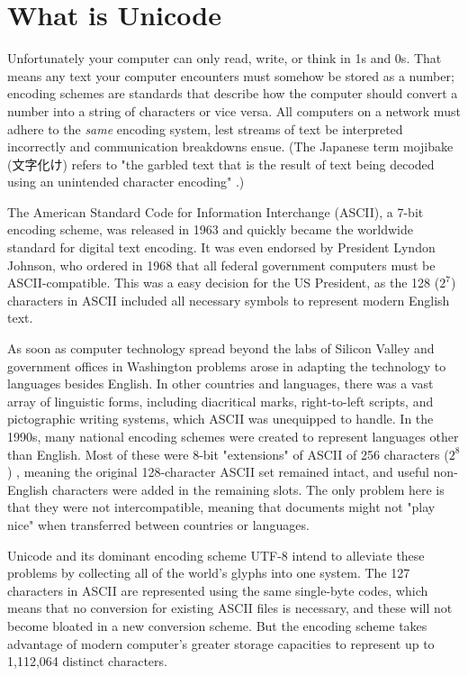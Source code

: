 \section{What is Unicode}

Unfortunately your computer can only read, write, or think in 1s and 0s. That
means any text your computer encounters must somehow be stored as a number;
encoding schemes are standards that describe how the computer should convert a
number into a string of characters or vice versa. All computers on a network
must adhere to the \textit{same} encoding system, lest streams of text be
interpreted incorrectly and communication breakdowns ensue. (The Japanese term
mojibake ({\jpfont 文字化け}) refers to "the garbled text that is the result of
text being decoded using an unintended character encoding"
\parencite{mojibake}.)

The American Standard Code for Information Interchange (ASCII), a 7-bit encoding
scheme, was released in 1963 and quickly became the worldwide standard for
digital text encoding. It was even endorsed by President Lyndon Johnson, who
ordered in 1968 that all federal government computers must be ASCII-compatible.
This was a easy decision for the US President, as the 128 ($2^7$) characters in
ASCII included all necessary symbols to represent modern English text.
\parencite{tero12}

As soon as computer technology spread beyond the labs of Silicon Valley and
government offices in Washington problems arose in adapting the technology to
languages besides English. In other countries and languages, there was a vast
array of linguistic forms, including diacritical marks, right-to-left scripts,
and pictographic writing systems, which ASCII was unequipped to handle. In the
1990s, many national encoding schemes were created to represent languages other
than English. Most of these were 8-bit "extensions" of ASCII of 256 characters
($2^8$) , meaning the original 128-character ASCII set remained intact, and
useful non-English characters were added in the remaining slots. The only
problem here is that they were not intercompatible, meaning that documents might
not "play nice" when transferred between countries or languages.
\parencite{tero12}

Unicode and its dominant encoding scheme UTF-8 intend to alleviate these
problems by collecting all of the world's glyphs into one system. The 127
characters in ASCII are represented using the same single-byte codes, which
means that no conversion for existing ASCII files is necessary, and these will
not become bloated in a new conversion scheme. But the encoding scheme takes
advantage of modern computer's greater storage capacities to represent up to
1,112,064 distinct characters. 

